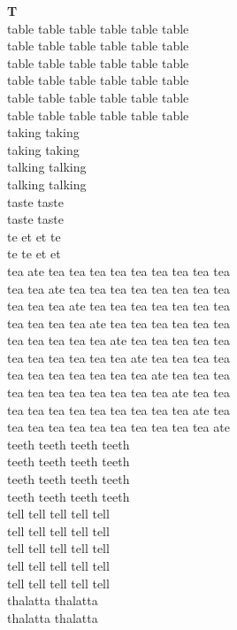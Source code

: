 \vspace{14pt}
\noindent\textbf{\Large T}\\[+12pt]
table table table table table table\\
table table table table table table\\
table table table table table table\\
table table table table table table\\
table table table table table table\\
table table table table table table\\
taking taking\\
taking taking\\
talking talking\\
talking talking\\
taste taste\\
taste taste\\
te et et te\\
te te et et\\
tea ate tea tea tea tea tea tea tea tea tea\\
tea tea ate tea tea tea tea tea tea tea tea\\
tea tea tea ate tea tea tea tea tea tea tea\\
tea tea tea tea ate tea tea tea tea tea tea\\
tea tea tea tea tea ate tea tea tea tea tea\\
tea tea tea tea tea tea ate tea tea tea tea\\
tea tea tea tea tea tea tea ate tea tea tea\\
tea tea tea tea tea tea tea tea ate tea tea\\
tea tea tea tea tea tea tea tea tea ate tea\\
tea tea tea tea tea tea tea tea tea tea ate\\
teeth teeth teeth teeth\\
teeth teeth teeth teeth\\
teeth teeth teeth teeth\\
teeth teeth teeth teeth\\
tell tell tell tell tell\\
tell tell tell tell tell\\
tell tell tell tell tell\\
tell tell tell tell tell\\
tell tell tell tell tell\\
thalatta thalatta\\
thalatta thalatta\\
